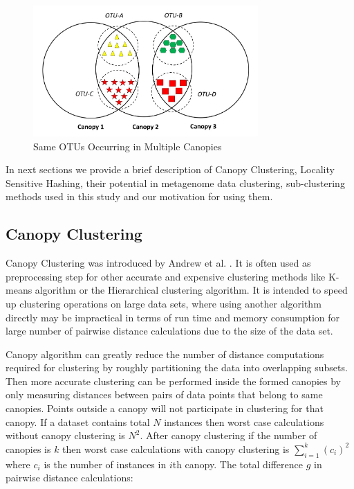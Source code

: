 \documentclass[10pt, conference, compsocconf]{IEEEtran}
\begin{document}
\begin{figure}
	\centering
	\includegraphics[width=\linewidth,height=5cm]{merge.jpg}	
	\caption{Same OTUs Occurring in Multiple Canopies}
	\label{fig:merge}
\end{figure}  

In next sections we provide a brief description of Canopy Clustering, Locality Sensitive Hashing, their potential in metagenome data clustering, sub-clustering methods used in this study and our motivation for using them.  

\subsection{Canopy Clustering}

Canopy Clustering was introduced by  Andrew et al. \cite{MARCanopy}. It is often used as preprocessing step for other accurate and expensive clustering methods like K-means algorithm or the Hierarchical clustering algorithm. It is intended to speed up clustering operations on large data sets, where using another algorithm directly may be impractical in terms of run time and memory consumption for large number of pairwise distance calculations due to the size of the data set.

Canopy algorithm can greatly reduce the number of distance computations required for clustering by roughly partitioning the data into overlapping subsets. Then more accurate clustering can be performed inside the formed canopies by only measuring distances between pairs of data points that belong to same canopies. Points outside a canopy will not participate in clustering for that canopy. If a dataset contains total $N$ instances then worst case calculations without canopy clustering is $N^2$. After canopy clustering if the number of canopies is $k$ then worst case calculations with canopy clustering is $\sum_{i=1}^{k}(c_i)^2$ where $c_i$ is the number of instances in $i$th canopy. The total difference $g$ in pairwise distance calculations:
\end{document}

